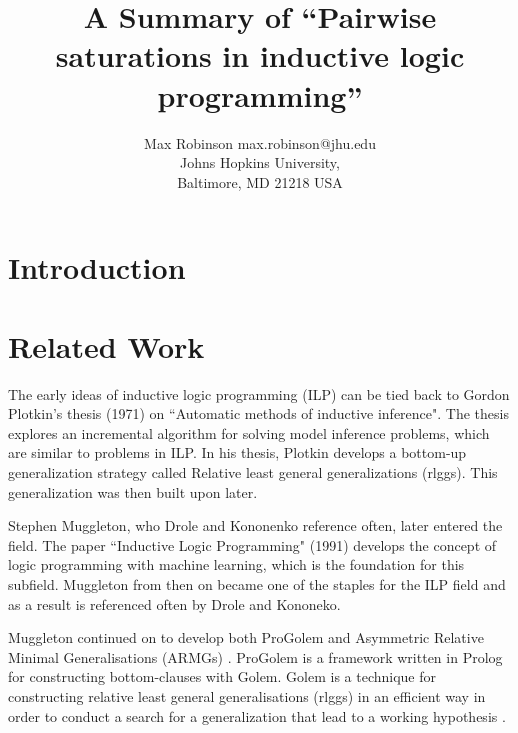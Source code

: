\documentclass[jair,twoside,11pt,theapa]{article}
\begin{document}
\title{A Summary of ``Pairwise saturations in inductive logic programming''}

\author{\name Max Robinson \email max.robinson@jhu.edu \\
       \addr Johns Hopkins University,\\
       Baltimore, MD 21218 USA
   }


\maketitle


\section{Introduction}
\label{Introduction}

\section{Related Work}
\label{relatedwork}
The early ideas of inductive logic programming (ILP) can be tied back to Gordon Plotkin's thesis (1971) on ``Automatic methods of inductive inference". The thesis explores an incremental algorithm for solving model inference problems, which are similar to problems in ILP. In his thesis, Plotkin develops a bottom-up generalization strategy called Relative least general generalizations (rlggs). This generalization was then built upon later.

Stephen Muggleton, who Drole and Kononenko reference often, later entered the field. The paper ``Inductive Logic Programming" (1991) develops the concept of logic programming with machine learning, which is the foundation for this subfield. Muggleton from then on became one of the staples for the ILP field and as a result is referenced often by Drole and Kononeko. 

Muggleton continued on to develop both ProGolem and Asymmetric Relative Minimal Generalisations (ARMGs) \cite{ProGolem}. ProGolem is a framework written in Prolog for constructing bottom-clauses with Golem. Golem is a technique for constructing relative least general generalisations (rlggs) in an efficient way in order to conduct a search for a generalization that lead to a working hypothesis \cite{1990}. 
\end{document}

